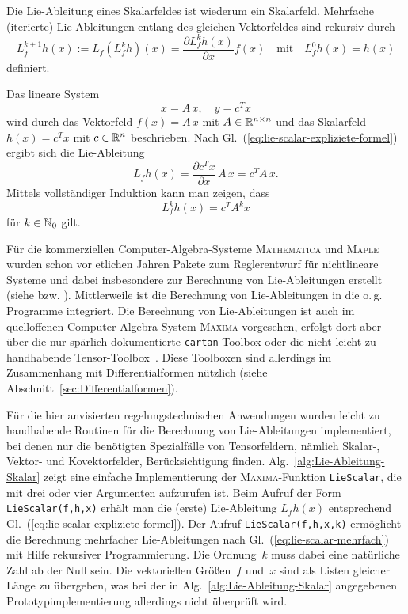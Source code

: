 Die Lie-Ableitung eines Skalarfeldes ist wiederum ein Skalarfeld.
Mehrfache (iterierte) Lie-Ableitungen entlang des gleichen Vektorfeldes
sind rekursiv durch 
\begin{equation}
L_{f}^{k+1}h(x):=L_{f}\left(L_{f}^{k}h\right)(x)=\frac{\partial L_{f}^{k}h(x)}{\partial x}f(x)\quad\mbox{mit}\quad L_{f}^{0}h(x)=h(x)\label{eq:lie-scalar-mehrfach}
\end{equation}
definiert. 

\begin{example}
\label{exa:lie-skalar-linear}Das lineare System
\begin{equation}
\dot{x}=A\,x,\quad y=c^{T}x\label{eq:lie-skalar-lineares-system}
\end{equation}
wird durch das Vektorfeld $f(x)=A\,x$ mit $A\in{\mathbb{R}}^{n\times n}$ und
das Skalarfeld $h(x)=c^{T}x$ mit $c\in{\mathbb{R}}^{n}$ beschrieben. Nach
Gl.~(\ref{eq:lie-scalar-expliziete-formel}) ergibt sich die Lie-Ableitung
\[
L_{f}h(x)=\frac{\partial c^{T}x}{\partial x}\,A\,x=c^{T}A\,x.
\]
Mittels vollständiger Induktion kann man zeigen, dass 
\[
L_{f}^{k}h(x)=c^{T}A^{k}x
\]
für $k\in{\mathbb{N}_0}$ gilt.
\end{example}

\begin{remark}
Für die kommerziellen Computer-Algebra-Systeme \textsc{Mathematica}
und \textsc{Maple} wurden schon vor etlichen Jahren Pakete zum Reglerentwurf
für nichtlineare Systeme und dabei insbesondere zur Berechnung von
Lie-Ableitungen erstellt (siehe \cite{polyakov94,rothfuss95,kwatny2000}
bzw. \cite{lemmen1995,kugi99}). Mittlerweile ist die Berechnung von
Lie-Ableitungen in die o.\,g. Programme integriert. Die Berechnung
von Lie-Ableitungen ist auch im quelloffenen Computer-Algebra-System
\textsc{Maxima} vorgesehen, erfolgt dort aber über die nur spärlich
dokumentierte \texttt{cartan}-Toolbox oder die nicht leicht zu handhabende
Tensor-Toolbox~\cite{toth2005}. Diese Toolboxen sind allerdings
im Zusammenhang mit Differentialformen nützlich (siehe Abschnitt~\ref{sec:Differentialformen}).

Für die hier anvisierten regelungstechnischen Anwendungen wurden leicht
zu handhabende Routinen für die Berechnung von Lie-Ableitungen implementiert,
bei denen nur die benötigten Spezialfälle von Tensorfeldern, nämlich
Skalar-, Vektor- und Kovektorfelder, Berücksichtigung finden. Alg.~\ref{alg:Lie-Ableitung-Skalar}
zeigt eine einfache Implementierung der \textsc{Maxima}-Funktion \texttt{LieScalar},
die mit drei oder vier Argumenten aufzurufen ist. Beim Aufruf der
Form \texttt{LieScalar(f,h,x)} erhält man die (erste) Lie-Ableitung
$L_{f}h(x)$ entsprechend Gl.~(\ref{eq:lie-scalar-expliziete-formel}).
Der Aufruf \texttt{LieScalar(f,h,x,k)} ermöglicht die Berechnung mehrfacher
Lie-Ableitungen nach Gl.~(\ref{eq:lie-scalar-mehrfach}) mit Hilfe
rekursiver Programmierung. Die Ordnung~$k$ muss dabei eine natürliche
Zahl ab der Null sein. Die vektoriellen Größen~$f$ und~$x$ sind
als Listen gleicher Länge zu übergeben, was bei der in Alg.~\ref{alg:Lie-Ableitung-Skalar}
angegebenen Prototypimplementierung allerdings nicht überprüft wird. 
\end{remark}

